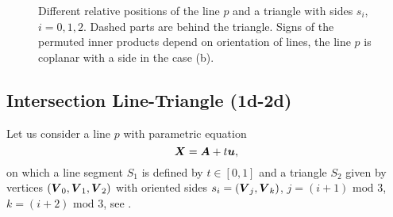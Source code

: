 \begin{figure}[!htb]
    \centering
    \hspace{2ex}
    \hspace{2ex}
    \caption[Geometric illustration of \plucker products.]
    {Different relative positions of the line $p$ and a triangle with sides $s_i$, $i=0,1,2$. 
        Dashed parts are behind the triangle. Signs of the permuted inner products depend on orientation of lines,
        the line $p$ is coplanar with a side in the case (b).}
    \label{fig:plucker_products}
\end{figure}




\subsection{Intersection Line-Triangle (1d-2d)}
\label{sec:1d-2d}
Let us consider a line $p$ with parametric equation 
\begin{equation}
    \label{eq:line_parametric}
    \mathbf{\boldsymbol{X}} = \mathbf{\boldsymbol{A}} + t\mathbf{\boldsymbol{u}},
\end{equation}
on which a line segment $S_1$ is defined by $t\in [0,1]$ and a triangle $S_2$ given by vertices $(\mathbf{\boldsymbol{V}}_0, \mathbf{\boldsymbol{V}}_1, \mathbf{\boldsymbol{V}}_2)$ 
with oriented sides $s_i=(\mathbf{\boldsymbol{V}}_j, \mathbf{\boldsymbol{V}}_k)$, $j=(i+1)\text{ mod }3$, $k=(i+2)\text{ mod }3$, see .

